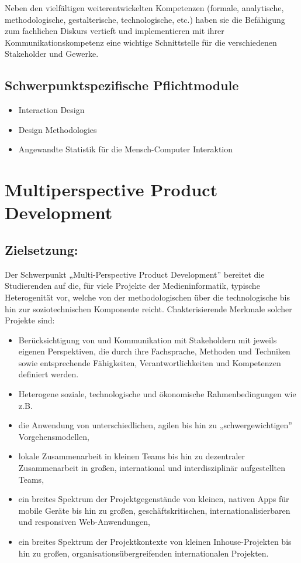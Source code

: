 Neben den vielfältigen weiterentwickelten Kompetenzen (formale,
analytische, methodologische, gestalterische, technologische, etc.)
haben sie die Befähigung zum fachlichen Diskurs vertieft und
implementieren mit ihrer Kommunikationskompetenz eine wichtige
Schnittstelle für die verschiedenen Stakeholder und Gewerke.

\section*{Schwerpunktspezifische
Pflichtmodule}\label{schwerpunktspezifische-pflichtmodule}

\begin{itemize}
\item
  Interaction Design
\item
  Design Methodologies
\item
  Angewandte Statistik für die Mensch-Computer Interaktion
\end{itemize}

\chapter{Multiperspective Product
Development}\label{multiperspective-product-development}

\section*{Zielsetzung:}\label{zielsetzung}

Der Schwerpunkt „Multi-Perspective Product Development'' bereitet die
Studierenden auf die, für viele Projekte der Medieninformatik, typische
Heterogenität vor, welche von der methodologischen über die
technologische bis hin zur soziotechnischen Komponente reicht.
Chakterisierende Merkmale solcher Projekte sind:

\begin{itemize}
\item
  Berücksichtigung von und Kommunikation mit Stakeholdern mit jeweils
  eigenen Perspektiven, die durch ihre Fachsprache, Methoden und
  Techniken sowie entsprechende Fähigkeiten, Verantwortlichkeiten und
  Kompetenzen definiert werden.
\item
  Heterogene soziale, technologische und ökonomische Rahmenbedingungen
  wie z.B.
\item
  die Anwendung von unterschiedlichen, agilen bis hin zu
  „schwergewichtigen'' Vorgehensmodellen,
\item
  lokale Zusammenarbeit in kleinen Teams bis hin zu dezentraler
  Zusammenarbeit in großen, international und interdisziplinär
  aufgestellten Teams,
\item
  ein breites Spektrum der Projektgegenstände von kleinen, nativen Apps
  für mobile Geräte bis hin zu großen, geschäftskritischen,
  internationalisierbaren und responsiven Web-Anwendungen,
\item
  ein breites Spektrum der Projektkontexte von kleinen Inhouse-Projekten
  bis hin zu großen, organisationsübergreifenden internationalen
  Projekten.
\end{itemize}

